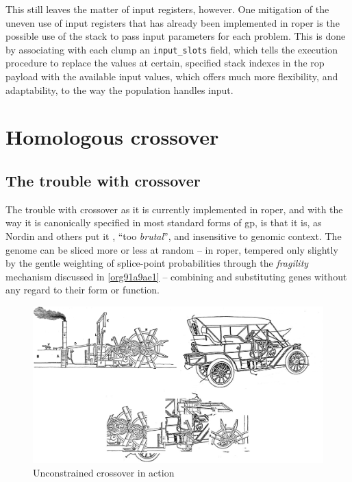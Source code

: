 \documentclass[12pt,glossary]{dalthesis}
\begin{document}
This still leaves the matter of input registers, however. One mitigation of the uneven use of
input registers that has already been implemented in \gls{roper} is the possible use of the
stack to pass input parameters for each problem. This is done by associating with each
clump an \texttt{input\_slots} field, which tells the execution procedure to replace the values at
certain, specified stack indexes in the \gls{rop} payload with the available input values, which
offers much more flexibility, and adaptability, to the way the population handles input. 

\section{Homologous crossover}
\label{sec:org2947f15}
\label{org3dcc4d7}
\subsection{The trouble with crossover}
\label{sec:orgf6c72ec}
The trouble with crossover as it is currently implemented in \gls{roper}, and with
the way it is canonically specified in most standard forms of \gls{gp},
is that it is, as Nordin and others put it \cite{nordin99}, ``too \emph{brutal}'', and
insensitive to genomic context. The genome can be sliced more or less at random --
in \gls{roper}, tempered only slightly by the gentle weighting of splice-point probabilities
through the \emph{fragility} mechanism discussed in \ref{org91a9ae1} -- combining and substituting
genes without any regard to their form or function.

\begin{figure}[htbp]
\centering
\includegraphics[width=.9\linewidth]{../images/carboat-montage.png}
\caption{\label{fig:org2a811da}
Unconstrained crossover in action}
\end{figure}
\end{document}
